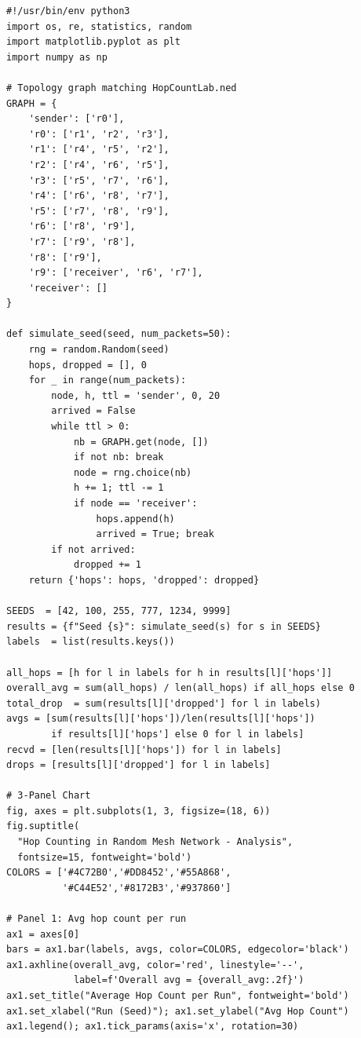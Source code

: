 \documentclass[12pt,a4paper]{article}
\begin{document}
\begin{lstlisting}[style=pystyle, caption={analyze\_results.py -- Statistics and 3-panel visualization}]
#!/usr/bin/env python3
import os, re, statistics, random
import matplotlib.pyplot as plt
import numpy as np

# Topology graph matching HopCountLab.ned
GRAPH = {
    'sender': ['r0'],
    'r0': ['r1', 'r2', 'r3'],
    'r1': ['r4', 'r5', 'r2'],
    'r2': ['r4', 'r6', 'r5'],
    'r3': ['r5', 'r7', 'r6'],
    'r4': ['r6', 'r8', 'r7'],
    'r5': ['r7', 'r8', 'r9'],
    'r6': ['r8', 'r9'],
    'r7': ['r9', 'r8'],
    'r8': ['r9'],
    'r9': ['receiver', 'r6', 'r7'],
    'receiver': []
}

def simulate_seed(seed, num_packets=50):
    rng = random.Random(seed)
    hops, dropped = [], 0
    for _ in range(num_packets):
        node, h, ttl = 'sender', 0, 20
        arrived = False
        while ttl > 0:
            nb = GRAPH.get(node, [])
            if not nb: break
            node = rng.choice(nb)
            h += 1; ttl -= 1
            if node == 'receiver':
                hops.append(h)
                arrived = True; break
        if not arrived:
            dropped += 1
    return {'hops': hops, 'dropped': dropped}

SEEDS  = [42, 100, 255, 777, 1234, 9999]
results = {f"Seed {s}": simulate_seed(s) for s in SEEDS}
labels  = list(results.keys())

all_hops = [h for l in labels for h in results[l]['hops']]
overall_avg = sum(all_hops) / len(all_hops) if all_hops else 0
total_drop  = sum(results[l]['dropped'] for l in labels)
avgs = [sum(results[l]['hops'])/len(results[l]['hops'])
        if results[l]['hops'] else 0 for l in labels]
recvd = [len(results[l]['hops']) for l in labels]
drops = [results[l]['dropped'] for l in labels]

# 3-Panel Chart
fig, axes = plt.subplots(1, 3, figsize=(18, 6))
fig.suptitle(
  "Hop Counting in Random Mesh Network - Analysis",
  fontsize=15, fontweight='bold')
COLORS = ['#4C72B0','#DD8452','#55A868',
          '#C44E52','#8172B3','#937860']

# Panel 1: Avg hop count per run
ax1 = axes[0]
bars = ax1.bar(labels, avgs, color=COLORS, edgecolor='black')
ax1.axhline(overall_avg, color='red', linestyle='--',
            label=f'Overall avg = {overall_avg:.2f}')
ax1.set_title("Average Hop Count per Run", fontweight='bold')
ax1.set_xlabel("Run (Seed)"); ax1.set_ylabel("Avg Hop Count")
ax1.legend(); ax1.tick_params(axis='x', rotation=30)


\end{lstlisting}
\end{document}

